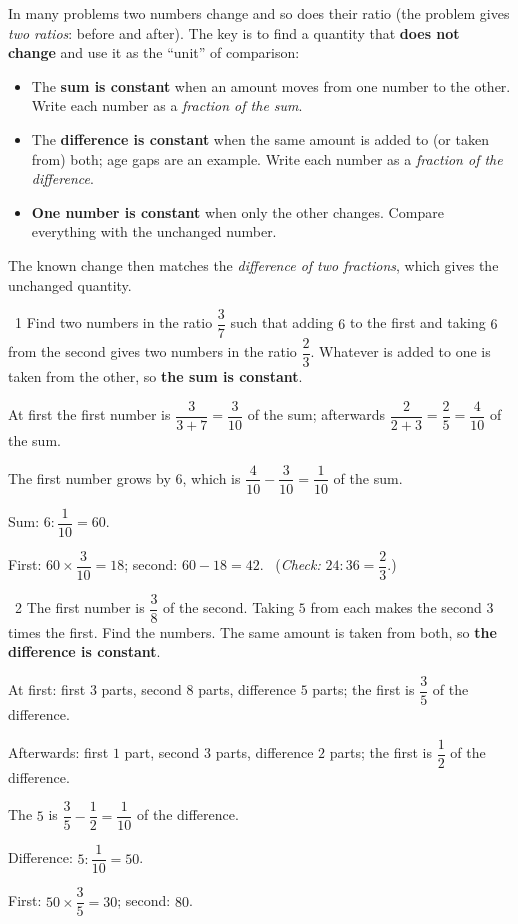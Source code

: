 \begin{knowbox}
In many problems two numbers change and so does their ratio (the problem gives \emph{two ratios}: before and after). The key is to find a quantity that \textbf{does not change} and use it as the ``unit'' of comparison:
\begin{itemize}[leftmargin=1.4em,itemsep=3pt]
\item The \textbf{sum is constant} when an amount moves from one number to the other. Write each number as a \emph{fraction of the sum}.
\item The \textbf{difference is constant} when the same amount is added to (or taken from) both; age gaps are an example. Write each number as a \emph{fraction of the difference}.
\item \textbf{One number is constant} when only the other changes. Compare everything with the unchanged number.
\end{itemize}
The known change then matches the \emph{difference of two fractions}, which gives the unchanged quantity.
\end{knowbox}
\gap
\begin{exbox}{\ExWord\ 1}
Find two numbers in the ratio $\dfrac37$ such that adding $6$ to the first and taking $6$ from the second gives two numbers in the ratio $\dfrac23$.
\guide
Whatever is added to one is taken from the other, so \textbf{the sum is constant}.\par
At first the first number is $\dfrac3{3+7}=\dfrac3{10}$ of the sum; afterwards $\dfrac2{2+3}=\dfrac25=\dfrac4{10}$ of the sum.\par
The first number grows by $6$, which is $\dfrac4{10}-\dfrac3{10}=\dfrac1{10}$ of the sum.\par Sum: $6:\dfrac1{10}=60$.\par
First: $60\times\dfrac3{10}=18$; second: $60-18=42$. \ (\emph{Check:} $24:36=\dfrac23$.)
\end{exbox}
\gap
\begin{exbox}{\ExWord\ 2}
The first number is $\dfrac38$ of the second. Taking $5$ from each makes the second $3$ times the first. Find the numbers.
\guide
The same amount is taken from both, so \textbf{the difference is constant}.\par
At first: first $3$ parts, second $8$ parts, difference $5$ parts; the first is $\dfrac35$ of the difference.\par
Afterwards: first $1$ part, second $3$ parts, difference $2$ parts; the first is $\dfrac12$ of the difference.\par
The $5$ is $\dfrac35-\dfrac12=\dfrac1{10}$ of the difference.\par Difference: $5:\dfrac1{10}=50$.\par First: $50\times\dfrac35=30$; second: $80$.
\end{exbox}
